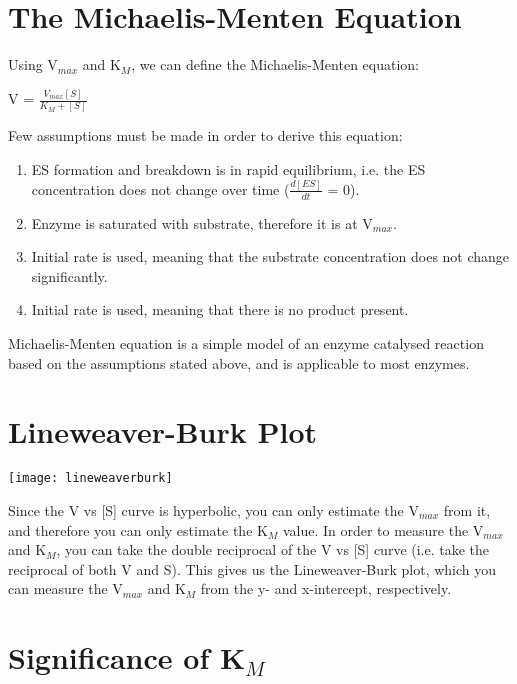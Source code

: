 \section{The Michaelis-Menten Equation}

Using V$_{max}$ and K$_M$, we can define the Michaelis-Menten equation:

\begin{center}
\large{V = $\frac{V_{max} [S]}{K_M + [S]}$}
\end{center}

Few assumptions must be made in order to derive this equation:
\begin{center}
\end{center}
\begin{enumerate}
\item ES formation and breakdown is in rapid equilibrium, i.e. the ES concentration does not change over time ({$\frac{d[ES]}{dt}$} = 0).
\item Enzyme is saturated with substrate, therefore it is at V$_{max}$.
\item Initial rate is used, meaning that the substrate concentration does not change significantly.
\item Initial rate is used, meaning that there is no product present.
\end{enumerate}

Michaelis-Menten equation is a simple model of an enzyme catalysed reaction based on the assumptions stated above, and is applicable to most enzymes.

\section{Lineweaver-Burk Plot}

\begin{center}
\texttt{[image: lineweaverburk]}
\end{center}

Since the V vs [S] curve is hyperbolic, you can only estimate the V$_{max}$ from it, and therefore you can only estimate the K$_M$ value.
In order to measure the V$_{max}$ and K$_M$, you can take the double reciprocal of the V vs [S] curve (i.e. take the reciprocal of both V and S).
This gives us the Lineweaver-Burk plot, which you can measure the V$_{max}$ and K$_M$ from the y- and x-intercept, respectively.

\section{Significance of K$_M$}

